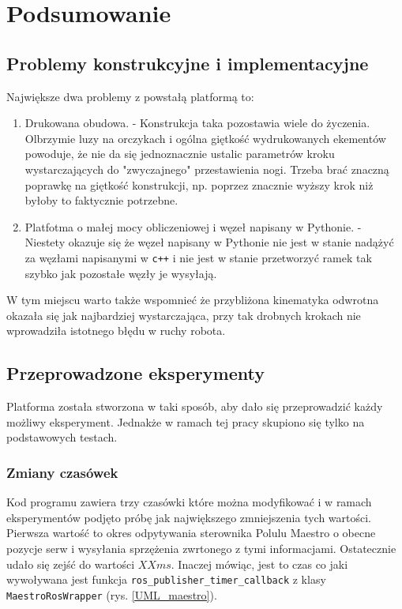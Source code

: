 \chapter{Podsumowanie}
\section{Problemy konstrukcyjne i implementacyjne}
\label{cha:problems}
Największe dwa problemy z powstałą platformą to:
\begin{enumerate}
    \item Drukowana obudowa. - Konstrukcja taka pozostawia wiele do życzenia. Olbrzymie luzy na orczykach i ogólna giętkość wydrukowanych ekementów powoduje, że nie da się jednoznacznie ustalic parametrów kroku wystarczających do "zwyczajnego" przestawienia nogi. Trzeba brać znaczną poprawkę na giętkość konstrukcji, np. poprzez znacznie wyższy krok niż byłoby to faktycznie potrzebne.\\
    \item Platfotma o małej mocy obliczeniowej i węzeł napisany w Pythonie. - Niestety okazuje się że węzeł napisany w Pythonie nie jest w stanie nadążyć za węzłami napisanymi w \texttt{c++} i nie jest w stanie przetworzyć ramek tak szybko jak pozostałe węzły je wysyłają. 
\end{enumerate}

W tym miejscu warto także wspomnieć że przybliżona kinematyka odwrotna okazała się jak najbardziej wystarczająca, przy tak drobnych krokach nie wprowadziła istotnego błędu w ruchy robota.\\

\section{Przeprowadzone eksperymenty}
Platforma została stworzona w taki sposób, aby dało się przeprowadzić każdy możliwy eksperyment. Jednakże w ramach tej pracy skupiono się tylko na podstawowych testach.

\subsection{Zmiany czasówek}
Kod programu zawiera trzy czasówki które można modyfikować i w ramach eksperymentów podjęto próbę jak największego zmniejszenia tych wartości.\\

Pierwsza wartość to okres odpytywania sterownika Polulu Maestro o obecne pozycje serw i wysyłania sprzężenia zwrtonego z tymi informacjami. Ostatecznie udało się zejść do wartości $XX ms$. Inaczej mówiąc, jest to czas co jaki wywoływana jest funkcja \texttt{ros\_publisher\_timer\_callback} z klasy \texttt{MaestroRosWrapper} (rys. \ref{UML_maestro}).\\

